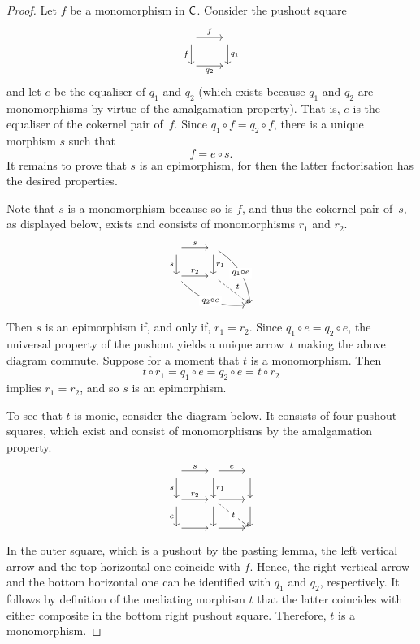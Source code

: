 \documentclass[a4paper,10pt,reqno]{amsart}
\theoremstyle{definition}
\theoremstyle{remark}
\newcommand{\cat}{{\sf C}}								%
\begin{document}
	\begin{proof}
	Let $f$ be a monomorphism in $\cat$. Consider the pushout square
	\[\begin{tikzcd}
	 \arrow{r}{f} \arrow{d}[swap]{f} & {} \arrow{d}{q_{1}} \\
	\arrow{r}[swap]{q_{2}} {} & {} 
	\end{tikzcd}\]
	and let $e$ be the equaliser of $q_{1}$ and $q_{2}$ (which exists because $q_{1}$ and $q_{2}$ are monomorphisms by virtue of the amalgamation property). That is, $e$ is the equaliser of the cokernel pair of~$f$.
	Since $q_1\circ f=q_2\circ f$, there is a unique morphism $s$ such that
	\[
	f=e\circ s.
	\]
	It remains to prove that $s$ is an epimorphism, for then the latter factorisation has the desired properties.

	Note that $s$ is a monomorphism because so is $f$, and thus the cokernel pair of~$s$, as displayed below, exists and consists of monomorphisms $r_1$ and $r_2$.
	\[\begin{tikzcd}
{} \arrow{r}{s} \arrow{d}[swap]{s} & {} \arrow{d}{r_{1}} \arrow[bend left=25]{ddr}[description]{q_{1}\circ e} & {} \\
\arrow{r}{r_{2}} \arrow[bend right=25]{drr}[description]{q_{2}\circ e} {} & {} \arrow[dashed]{dr}{t}  & {} \\
{} & {} & {} 
\end{tikzcd}\]
	Then $s$ is an epimorphism if, and only if, $r_1=r_2$. Since $q_{1}\circ e=q_{2}\circ e$, the universal property of the pushout yields a unique arrow~$t$ making the above diagram commute. Suppose for a moment that $t$ is a monomorphism. Then
	\[
	t\circ r_{1} = q_{1}\circ e = q_{2}\circ e = t\circ r_{2}
	\]
	implies $r_{1}=r_{2}$, and so $s$ is an epimorphism.

	To see that $t$ is monic, consider the diagram below. It consists of four pushout squares, which exist and consist of monomorphisms by the amalgamation property.
	\[\begin{tikzcd}
	{} \arrow{r}{s} \arrow{d}[swap]{s} & {} \arrow{r}{e} \arrow{d}{r_{1}} & {} \arrow{d} \\
	{} \arrow{r}{r_{2}} \arrow{d}[swap]{e} & {} \arrow{r} \arrow{d}  \arrow[dashed]{dr}[description]{t} & {} \arrow{d}  \\
	{} \arrow{r} & {} \arrow{r}  & {} 
	\end{tikzcd}\]
	In the outer square, which is a pushout by the pasting lemma, the left vertical arrow and the top horizontal one coincide with $f$. Hence, the right vertical arrow and the bottom horizontal one can be identified with $q_{1}$ and $q_{2}$, respectively. It follows by definition of the mediating morphism $t$ that the latter coincides with either composite in the bottom right pushout square. Therefore, $t$ is a monomorphism.
	\end{proof}
\end{document}
